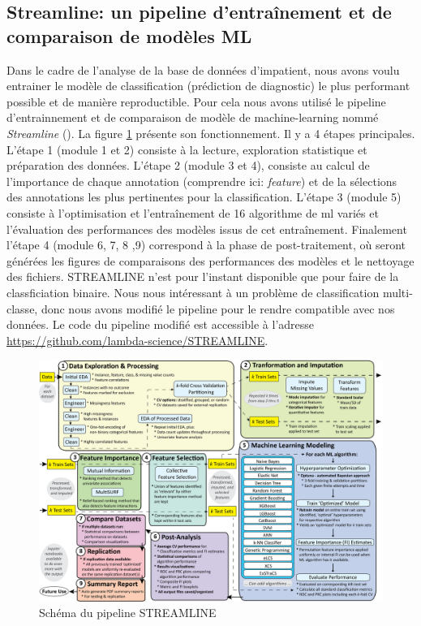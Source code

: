 \subsection{Streamline: un pipeline d'entraînement et de comparaison de modèles ML}
Dans le cadre de l'analyse de la base de données d'\gls{impatient}, nous avons voulu entrainer le modèle de classification (prédiction de diagnostic) le plus performant possible et de manière reproductible. Pour cela nous avons utilisé le pipeline d'entrainnement et de comparaison de modèle de machine-learning nommé \textit{Streamline} (\cite{urbanowicz_streamline_2023}). La figure \ref{fig:streamline} présente son fonctionnement. Il y a 4 étapes principales. L'étape 1 (module 1 et 2) consiste à la lecture, exploration statistique et préparation des données. L'étape 2 (module 3 et 4), consiste au calcul de l'importance de chaque annotation (comprendre ici: \textit{feature}) et de la sélections des annotations les plus pertinentes pour la classification. L'étape 3 (module 5) consiste à l'optimisation et l'entraînement de 16 algorithme de \gls{ml} variés et l'évaluation des performances des modèles issus de cet entraînement. Finalement l'étape 4 (module 6, 7, 8 ,9) correspond à la phase de post-traitement, où seront générées les figures de comparaisons des performances des modèles et le nettoyage des fichiers. STREAMLINE n'est pour l'instant disponible que pour faire de la classficiation binaire. Nous nous intéressant à un problème de classification multi-classe, donc nous avons modifié le pipeline pour le rendre compatible avec nos données. Le code du pipeline modifié est accessible à l'adresse \href{https://github.com/lambda-science/STREAMLINE}{https://github.com/lambda-science/STREAMLINE}.
\begin{figure}[!htbp]
 \centering
 \includegraphics[width=1\textwidth]{figures/STREAMLINE_paper_lightcolor.png}
 \caption[Pipeline STREAMLINE]{Schéma du pipeline STREAMLINE}
 \label{fig:streamline}
\end{figure}
